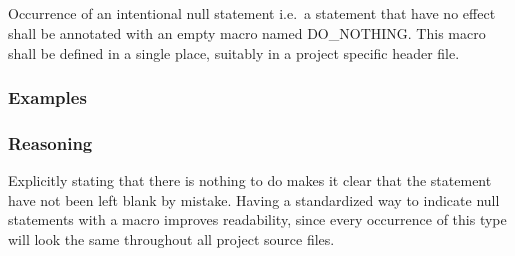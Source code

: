 \subsection*{\codingRule{}}

Occurrence of an intentional null statement i.e.\ a statement that have no effect shall be annotated with an empty macro named DO\_NOTHING. This macro shall be defined in a single place, suitably in a project specific header file.    %

\subsubsection*{Examples}

\noindent
\begin{minipage}[t]{\codelstwidth\linewidth}
    
\end{minipage}
\hfill
\begin{minipage}[t]{\codelstwidth\linewidth}
     
    
\end{minipage}

\subsubsection*{Reasoning}

Explicitly stating that there is nothing to do makes it clear that the statement have not been left blank by mistake. Having a standardized way to indicate null statements with a macro improves readability, since every occurrence of this type will look the same throughout all project source files.